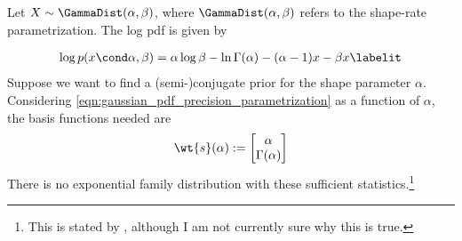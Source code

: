 \begin{example} 
Let $X \sim \GammaDist(\alpha, \beta)$, where $\GammaDist(\alpha, \beta)$ refers to the shape-rate parametrization.  The log pdf is given by

\begin{align*}
 \log p(x \cond \alpha, \beta) = \alpha \log \beta - \ln \Gamma(\alpha) - (\alpha -1 ) x - \beta x 
 \labelit \label{eqn:gamma_pdf}
\end{align*}  
Suppose we want to find a (semi-)conjugate prior for the shape parameter $\alpha$.  Considering \eqref{eqn:gaussian_pdf_precision_parametrization} as a function of $\alpha$, the basis functions needed are
\[ \wt{\sufficientStatsFunction}(\alpha) := 
\begin{bmatrix} 
\alpha \\
\Gamma(\alpha) 
\end{bmatrix} 
  \]
There is no exponential family distribution with these sufficient statistics.\footnote{This is stated by \cite{winn2005variational}, although I am not currently sure why this is true.} 
\end{example}

